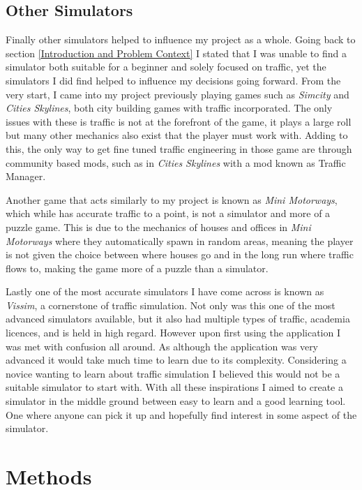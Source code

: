 \documentclass[10pt,twocolumn]{article}
\begin{document}
\subsection{Other Simulators}
Finally other simulators helped to influence my project as a whole. Going back to section \ref{Introduction and Problem Context} I stated that I was unable to find a simulator both suitable for a beginner and solely focused on traffic, yet the simulators I did find helped to influence my decisions going forward. From the very start, I came into my project previously playing games such as \textit{Simcity} and \textit{Cities Skylines}, both city building games with traffic incorporated. The only issues with these is traffic is not at the forefront of the game, it plays a large roll but many other mechanics also exist that the player must work with. Adding to this, the only way to get fine tuned traffic engineering in those game are through community based mods, such as in \textit{Cities Skylines} with a mod known as Traffic Manager. 

Another game that acts similarly to my project is known as \textit{Mini Motorways}, which while has accurate traffic to a point, is not a simulator and more of a puzzle game. This is due to the mechanics of houses and offices in \textit{Mini Motorways} where they automatically spawn in random areas, meaning the player is not given the choice between where houses go and in the long run where traffic flows to, making the game more of a puzzle than a simulator. 

Lastly one of the most accurate simulators I have come across is known as \textit{Vissim}, a cornerstone of traffic simulation. Not only was this one of the most advanced simulators available, but it also had multiple types of traffic, academia licences, and is held in high regard. However upon first using the application I was met with confusion all around. As although the application was very advanced it would take much time to learn due to its complexity. Considering a novice wanting to learn about traffic simulation I believed this would not be a suitable simulator to start with. With all these inspirations I aimed to create a simulator in the middle ground between easy to learn and a good learning tool. One where anyone can pick it up and hopefully find interest in some aspect of the simulator.

\section{Methods}
\end{document}
